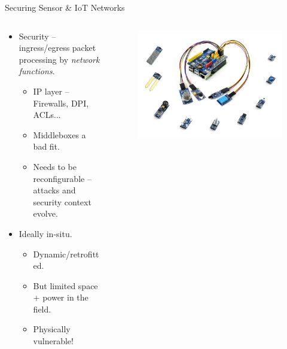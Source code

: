\documentclass[aspectratio=169,xcolor={dvipsnames}
,handout
]{beamer}
\begin{document}
\begin{frame}{Securing Sensor \& IoT Networks}
	\begin{columns}
		\begin{column}{0.6\linewidth}
			\begin{itemize}
				\item Security -- ingress/egress packet processing by \emph{network functions}.
				\begin{itemize}
					\item \alert{IP layer} -- Firewalls, DPI, ACLs...
					\item Middleboxes a bad fit.
					\item Needs to be \alert{reconfigurable} -- attacks and security context evolve.
				\end{itemize}
				\item Ideally \alert{in-situ}.
				\begin{itemize}
					\item Dynamic/retrofitted.
					\item But limited space + power in the field.
					\item Physically vulnerable!
				\end{itemize}
			\end{itemize}
		\end{column}
		\begin{column}{0.4\linewidth}
			\begin{figure}
				\includegraphics[keepaspectratio,width=\linewidth]{images/rpi-sens}
			\end{figure}
		\end{column}
	\end{columns}
\end{frame}
\end{document}
